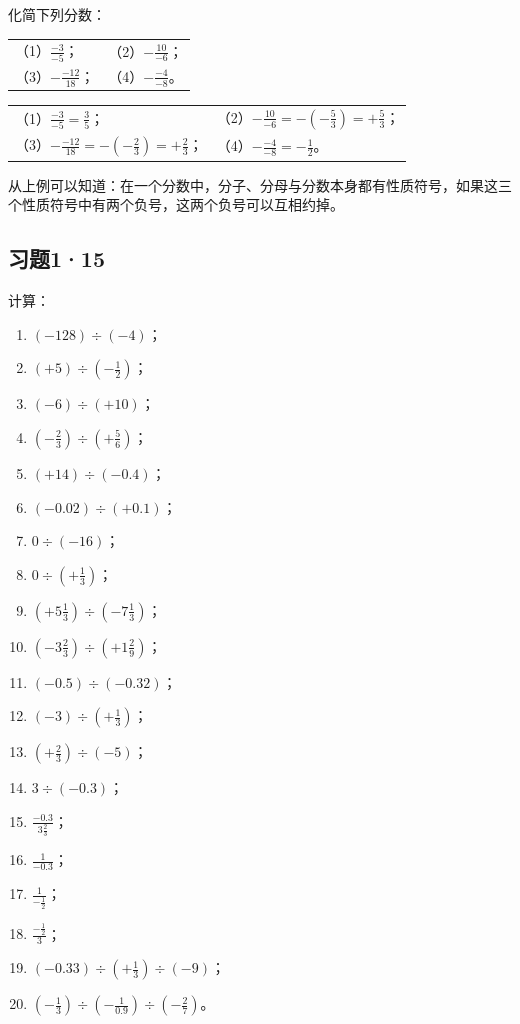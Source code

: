  化简下列分数：
\par\smallskip
\begin{tabular}{@{}ll@{}}
（1）\(\frac{-3}{-5}\)；\qquad\qquad & （2）\(-\frac{10}{-6}\)； \\[8pt]
（3）\(-\frac{-12}{18}\)； & （4）\(-\frac{-4}{-8}\)。
\end{tabular}

\begin{tabular}{@{}ll@{}}
（1）\(\frac{-3}{-5} = \frac{3}{5}\)； & （2）\(-\frac{10}{-6} = -\left(-\frac{5}{3}\right) = +\frac{5}{3}\)； \\[8pt]
（3）\(-\frac{-12}{18} = -\left(-\frac{2}{3}\right) = +\frac{2}{3}\)；\qquad & （4）\(-\frac{-4}{-8} = -\frac{1}{2}\)。
\end{tabular}

从上例可以知道：在一个分数中，分子、分母与分数本身都有性质符号，如果这三个性质符号中有两个负号，这两个负号可以互相约掉。

\subsection{习题1·15}

计算：

\begin{enumerate}
\item \((-128) \div (-4)\)；
\item \((+5) \div \left(-\frac{1}{2}\right)\)；
\item \((-6) \div (+10)\)；
\item \(\left(-\frac{2}{3}\right) \div \left(+\frac{5}{6}\right)\)；
\item \((+14) \div (-0.4)\)；
\item \((-0.02) \div (+0.1)\)；
\item \(0 \div (-16)\)；
\item \(0 \div \left(+\frac{1}{3}\right)\)；
\item \(\left(+5\frac{1}{3}\right) \div \left(-7\frac{1}{3}\right)\)；
\item \(\left(-3\frac{2}{3}\right) \div \left(+1\frac{2}{9}\right)\)；
\item \((-0.5) \div (-0.32)\)；
\item \((-3) \div \left(+\frac{1}{3}\right)\)；
\item \(\left(+\frac{2}{3}\right) \div (-5)\)；
\item \(3 \div (-0.3)\)；
\item \(\frac{-0.3}{3\frac{2}{3}}\)；
\item \(\frac{1}{-0.3}\)；
\item \(\frac{1}{-\frac{1}{2}}\)；
\item \(\frac{-\frac{1}{2}}{3}\)；
\item \((-0.33) \div \left(+\frac{1}{3}\right) \div (-9)\)；
\item \(\left(-\frac{1}{3}\right) \div \left(-\frac{1}{0.9}\right) \div \left(-\frac{2}{7}\right)\)。
\end{enumerate}

